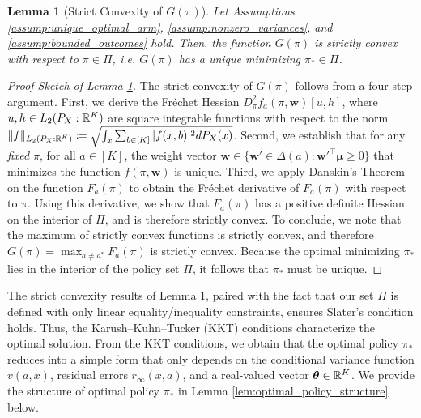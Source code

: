 \documentclass{article}
\newtheorem{lemma}{Lemma}
\begin{document}
\begin{lemma}[Strict Convexity of $G(\pi)$]\label{lem:convexity_policy}
    Let Assumptions \ref{assump:unique_optimal_arm}, \ref{assump:nonzero_variances}, and \ref{assump:bounded_outcomes} hold. Then, the function $G(\pi)$ is strictly convex with respect to $\pi \in \Pi$, i.e. $G(\pi)$ has a unique minimizing $\pi_* \in \Pi$.    
\end{lemma}

\begin{proof}[Proof Sketch of Lemma \ref{lem:convexity_policy}] The strict convexity of $G(\pi)$ follows from a four step argument. First, we derive the Fréchet Hessian $D^2_{\pi}f_a(\pi, \bm{w})[u,h]$, where $u,h \in L_2(P_X:\mathbb{R}^K)$ are square integrable functions with respect to the norm $\| f\|_{L_2(P_X:\mathbb{R}^K)} \coloneqq \sqrt{\int_{x} \sum_{b \in [K]} |f(x,b)|^2 dP_X(x)}$. Second, we establish that for any \textit{fixed} $\pi$, for all $a \in [K]$, the weight vector $\bm{w} \in \{\bm{w}' \in \Delta(a): \bm{w}'^\top \bm{\mu} \geq 0\}$ that minimizes the function $f(\pi, \bm{w})$ is unique. Third, we apply Danskin's Theorem \citep{bonnans2000perturbation} on the function $F_a(\pi)$ to obtain the Fréchet derivative of $F_a(\pi)$ with respect to $\pi$. Using this derivative, we show that $F_a(\pi)$ has a positive definite Hessian on the interior of $\Pi$, and is therefore strictly convex. To conclude, we note that the maximum of strictly convex functions is strictly convex, and therefore $G(\pi) = \max_{a \neq a^*} F_a(\pi)$ is strictly convex. Because the optimal minimizing $\pi_*$ lies in the interior of the policy set $\Pi$, it follows that $\pi_*$ must be unique. 
\end{proof}

The strict convexity results of Lemma \ref{lem:convexity_policy}, paired with the fact that our set $\Pi$ is defined with only linear equality/inequality constraints, ensures Slater's condition holds. Thus, the Karush–Kuhn–Tucker (KKT) conditions characterize the optimal solution. From the KKT conditions, we obtain that the optimal policy $\pi_*$ reduces into a simple form that only depends on the conditional variance function $v(a,x)$, residual errors $r_\infty(x, a)$, and a real-valued vector $\boldsymbol{\theta} \in \mathbb{R}^K$. We provide the structure of optimal policy $\pi_*$ in Lemma \ref{lem:optimal_policy_structure} below.
\end{document}
